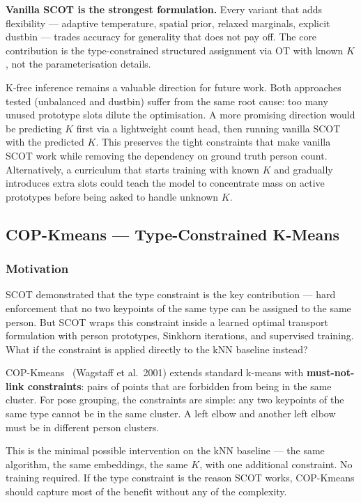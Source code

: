 \textbf{Vanilla SCOT is the strongest formulation.} Every variant that adds flexibility --- adaptive temperature, spatial prior, relaxed marginals, explicit dustbin --- trades accuracy for generality that does not pay off. The core contribution is the type-constrained structured assignment via OT with known $K$, not the parameterisation details.

K-free inference remains a valuable direction for future work. Both approaches tested (unbalanced and dustbin) suffer from the same root cause: too many unused prototype slots dilute the optimisation. A more promising direction would be predicting $K$ first via a lightweight count head, then running vanilla SCOT with the predicted $K$. This preserves the tight constraints that make vanilla SCOT work while removing the dependency on ground truth person count. Alternatively, a curriculum that starts training with known $K$ and gradually introduces extra slots could teach the model to concentrate mass on active prototypes before being asked to handle unknown $K$.


\subsection{COP-Kmeans --- Type-Constrained K-Means}

\subsubsection{Motivation}

SCOT demonstrated that the type constraint is the key contribution --- hard enforcement that no two keypoints of the same type can be assigned to the same person. But SCOT wraps this constraint inside a learned optimal transport formulation with person prototypes, Sinkhorn iterations, and supervised training. What if the constraint is applied directly to the kNN baseline instead?

COP-Kmeans~\cite{wagstaff2001copkmeans} (Wagstaff et al.\ 2001) extends standard k-means with \textbf{must-not-link constraints}: pairs of points that are forbidden from being in the same cluster. For pose grouping, the constraints are simple: any two keypoints of the same type cannot be in the same cluster. A left elbow and another left elbow must be in different person clusters.

This is the minimal possible intervention on the kNN baseline --- the same algorithm, the same embeddings, the same $K$, with one additional constraint. No training required. If the type constraint is the reason SCOT works, COP-Kmeans should capture most of the benefit without any of the complexity.


